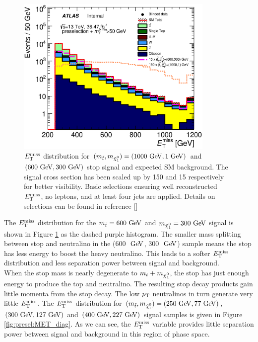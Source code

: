 \begin{figure}[h!]
\centering
    \includegraphics[width=0.85\textwidth]{figures/preselection/Met_preCutSRPlot_withRatio_log.eps}\hspace{0.05\textwidth}
\caption[Stop signal with $m_{\stop}-m_{\ninoone} >> m_t$ and SM background $\met$ distribution after loose preliminary selections for $\met>250 \gev$, zero leptons and at least four jets]{ $\met$ distribution for $(m_{\stop}, m_{\ninoone}) = (1000 \gev,1 \gev)$ and $(600 \gev, 300 \gev)$ stop signal and expected SM background.  The signal cross section has been scaled up by 150 and 15 respectively for better visibility.  Basic selections ensuring well reconstructed $\met$, no leptons, and at least four jets are applied.  Details on selections can be found in reference [\cite{stop0LCONF}] }
\label{fig:presel:MET}
\end{figure}

\indent The $\met$ distribution for the $m_{\stop} = 600 \gev$ and $m_{\ninoone} = 300 \gev$ signal is shown in Figure \ref{fig:presel:MET} as the dashed purple histogram.  The smaller mass splitting between stop and neutralino in the (600 $\gev$, 300 $\gev$) sample means the stop has less energy to boost the heavy neutralino.  This leads to a softer $\met$ distribution and less separation power between signal and background.  \\

\indent   When the stop mass is nearly degenerate to $m_t + m_{\ninoone}$, the stop has just enough energy to produce the top and neutralino.  The resulting stop decay products gain little momenta from the stop decay. The low $p_{\mathrm{T}}$ neutralinos in turn generate very little $\met$.  The $\met$ distribution for $(m_{\stop}, m_{\ninoone}) = (250 \gev,77 \gev)$, $(300 \gev, 127 \gev)$ and $(400 \gev, 227 \gev)$ signal samples is given in Figure \ref{fig:presel:MET_diag}.  As we can see, the $\met$ variable provides little separation power between signal and background in this region of phase space. \\

